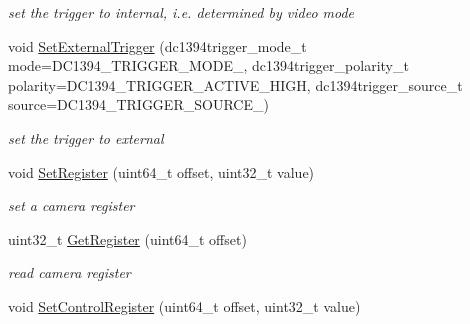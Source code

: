 \begin{DoxyCompactItemize}
\begin{DoxyCompactList}\small\item\em set the trigger to internal, i.\+e. determined by video mode \end{DoxyCompactList}\item 
void \hyperlink{classpangolin_1_1_firewire_video_a9afb190bea29b973da13be399793fb97}{Set\+External\+Trigger} (dc1394trigger\+\_\+mode\+\_\+t mode=D\+C1394\+\_\+\+T\+R\+I\+G\+G\+E\+R\+\_\+\+M\+O\+D\+E\+\_, dc1394trigger\+\_\+polarity\+\_\+t polarity=D\+C1394\+\_\+\+T\+R\+I\+G\+G\+E\+R\+\_\+\+A\+C\+T\+I\+V\+E\+\_\+\+H\+I\+GH, dc1394trigger\+\_\+source\+\_\+t source=D\+C1394\+\_\+\+T\+R\+I\+G\+G\+E\+R\+\_\+\+S\+O\+U\+R\+C\+E\+\_)\hypertarget{classpangolin_1_1_firewire_video_a9afb190bea29b973da13be399793fb97}{}\label{classpangolin_1_1_firewire_video_a9afb190bea29b973da13be399793fb97}

\begin{DoxyCompactList}\small\item\em set the trigger to external \end{DoxyCompactList}\item 
void \hyperlink{classpangolin_1_1_firewire_video_a8099ff483fdb5249f2c7ecf59135e2d9}{Set\+Register} (uint64\+\_\+t offset, uint32\+\_\+t value)\hypertarget{classpangolin_1_1_firewire_video_a8099ff483fdb5249f2c7ecf59135e2d9}{}\label{classpangolin_1_1_firewire_video_a8099ff483fdb5249f2c7ecf59135e2d9}

\begin{DoxyCompactList}\small\item\em set a camera register \end{DoxyCompactList}\item 
uint32\+\_\+t \hyperlink{classpangolin_1_1_firewire_video_ace2a55a3061f3f6567fbf65d9fe80cea}{Get\+Register} (uint64\+\_\+t offset)\hypertarget{classpangolin_1_1_firewire_video_ace2a55a3061f3f6567fbf65d9fe80cea}{}\label{classpangolin_1_1_firewire_video_ace2a55a3061f3f6567fbf65d9fe80cea}

\begin{DoxyCompactList}\small\item\em read camera register \end{DoxyCompactList}\item 
void \hyperlink{classpangolin_1_1_firewire_video_a7015ff3b7ab687d45cd8283c4081cd4e}{Set\+Control\+Register} (uint64\+\_\+t offset, uint32\+\_\+t value)\hypertarget{classpangolin_1_1_firewire_video_a7015ff3b7ab687d45cd8283c4081cd4e}{}\label{classpangolin_1_1_firewire_video_a7015ff3b7ab687d45cd8283c4081cd4e}


\end{DoxyCompactItemize}
